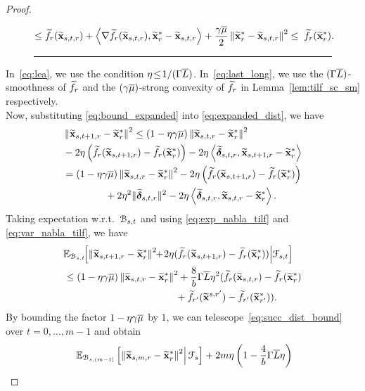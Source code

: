 \documentclass[10pt,twocolumn,journal]{IEEEtran}
\begin{document}
\begin{proof}
\begin{figure*}[h!]
\begin{align}
\le\;&\tilf_r (\tilbx_{s,t,r}) +\lrangle{\nabla \tilf_r (\tilbx_{s,t,r})}{\tilbx_r^*-\tilbx_{s,t,r}}+\frac{\gamma\barmu}{2}\norm{\tilbx_r^*-\tilbx_{s,t,r}}^2%
\le\;\tilf_r (\tilbx_{r}^*).\label{eq:last_long}
\end{align}\hrule
\end{figure*}
 In~\eqref{eq:lea}, we use the condition $\eta\!\le\! 1/(\Gamma\overline{L})$. In~\eqref{eq:last_long}, we use the $(\Gamma\overline{L})$-smoothness of $\widetilde{f}_r$ and the $(\gamma\overline{\mu})$-strong convexity of $\widetilde{f}_r$ in Lemma~\ref{lem:tilf_sc_sm} respectively.\\
Now, substituting \eqref{eq:bound_expanded} into \eqref{eq:expanded_dist}, we have
\begin{align}
&\left\Vert\widetilde{\mathbf{x}}_{s,t+1,r}-\widetilde{\mathbf{x}}_r^*\right\Vert^2 \le (1-\eta\gamma\overline{\mu})\left\Vert\widetilde{\mathbf{x}}_{s,t,r} - \widetilde{\mathbf{x}}_r^*\right\Vert^2 \nonumber\\
&- 2\eta\left(\widetilde{f}_r (\widetilde{\mathbf{x}}_{s,t+1,r})-\widetilde{f}_r (\widetilde{\mathbf{x}}_{r}^*)\right)-2\eta\left\langle{\widetilde{\bm{\delta}}_{s,t,r}},{\widetilde{\mathbf{x}}_{s,t+1,r}-\widetilde{\mathbf{x}}_r^*}\right\rangle\nonumber\\
&=(1-\eta\gamma\overline{\mu})\left\Vert\widetilde{\mathbf{x}}_{s,t,r} - \widetilde{\mathbf{x}}_r^*\right\Vert^2 - 2\eta\left(\widetilde{f}_r (\widetilde{\mathbf{x}}_{s,t+1,r})-\widetilde{f}_r (\widetilde{\mathbf{x}}_{r}^*)\right)\nonumber\\
&\hspace{1.5cm}+ {2\eta^2} \Vert\widetilde{\bm{\delta}}_{s,t,r}\Vert^2 -2\eta\left\langle{\widetilde{\bm{\delta}}_{s,t,r}},{\widetilde{\mathbf{x}}_{s,t,r}-\widetilde{\mathbf{x}}_r^*}\right\rangle.\label{eq:succ_bound_sqEuc}
\end{align} 
Taking expectation w.r.t.\ $\mathcal{B}_{s,t}$ and using \eqref{eq:exp_nabla_tilf} and \eqref{eq:var_nabla_tilf}, we have
\begin{align}
&\left.\!\!\bbE_{\calB_{s,t}}\!\!\left[\norm{\tilbx_{s,t+1,r}-\tilbx_r^*}^2\!\!+\!2\eta(\tilf_r (\tilbx_{s,t+1,r})-\tilf_r (\tilbx_{r}^*))\right\vert\!\calF_{s,t}\right]\nn\\
&\le(1-\eta\gamma\barmu)\norm{\tilbx_{s,t,r} - \tilbx_r^*}^2 +\frac{8}{b}\Gamma\barL\eta^2(\tilf_r(\tilbx_{s,t,r})-\tilf_r(\tilbx_r^*)\nn\\
&\hspace{4.cm}+\tilf_{r'}(\tilbx^{s,{r'}})-\tilf_{r'}(\tilbx_{r'}^*)).  \label{eq:succ_dist_bound}
\end{align}
By bounding the factor $1-\eta\gamma\overline{\mu}$ by $1$, we can telescope~\eqref{eq:succ_dist_bound} over $t=0,\ldots,m-1$ and obtain %
\begin{align}
&\left.\bbE_{\calB_{s,(m-1]}}\left[\norm{\tilbx_{s,m,r}-\tilbx_r^*}^2\right\vert\calF_{s}\right]+ 2m\eta\left(1-\frac{4}{b}\Gamma\barL\eta\right)\nn\\ 

\end{align}
\end{proof}
\end{document}

